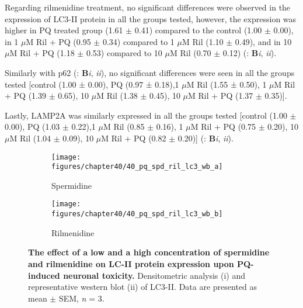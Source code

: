 Regarding rilmenidine treatment, no significant differences were observed in the expression of LC3-II protein in all the groups tested, however, the expression was higher in PQ treated group (1.61 $\pm$ 0.41) compared to the control (1.00 $\pm$ 0.00), in 1 $\mu$M Ril + PQ (0.95 $\pm$ 0.34) compared to 1 $\mu$M Ril (1.10 $\pm$ 0.49), and in 10 $\mu$M Ril + PQ (1.18 $\pm$ 0.53) compared to 10 $\mu$M Ril (0.70 $\pm$ 0.12) (: \textbf{B}\textit{i}, \textit{ii}).

Similarly with p62 (: \textbf{B}\textit{i}, \textit{ii}), no significant differences were seen in all the groups tested [control (1.00 ± 0.00), PQ (0.97 ± 0.18),1 $\mu$M Ril (1.55 ± 0.50), 1 $\mu$M Ril + PQ (1.39 $\pm$ 0.65), 10 $\mu$M Ril (1.38 $\pm$ 0.45), 10 $\mu$M Ril + PQ (1.37 $\pm$ 0.35)].

Lastly, LAMP2A was similarly expressed in all the groups tested [control (1.00 $\pm$ 0.00), PQ (1.03 $\pm$ 0.22),1 $\mu$M Ril (0.85 $\pm$ 0.16), 1 $\mu$M Ril + PQ (0.75 $\pm$ 0.20), 10 $\mu$M Ril (1.04 $\pm$ 0.09), 10 $\mu$M Ril + PQ (0.82 $\pm$ 0.20)] (: \textbf{B}\textit{i}, \textit{ii}).

\begin{figure}[!htbp]
  \center
  \begin{subfigure}[b]{0.495\linewidth}
    \texttt{[image: figures/chapter40/40\_pq\_spd\_ril\_lc3\_wb\_a]}
    \caption{Spermidine}
  \end{subfigure}
  \begin{subfigure}[b]{0.495\linewidth}
    \texttt{[image: figures/chapter40/40\_pq\_spd\_ril\_lc3\_wb\_b]}
    \caption{Rilmenidine}
  \end{subfigure}
  \caption[The effect of a low and a high concentration of spermidine and rilmenidine on LC-II protein expression upon PQ-induced neuronal toxicity]{\textbf{The effect of a low and a high concentration of spermidine and rilmenidine on LC-II protein expression upon PQ-induced neuronal toxicity.} Densitometric analysis (i) and representative western blot  (ii) of LC3-II. Data are presented as mean $\pm$ SEM, \textit{n} = 3.}
  \label{fig:40_pq_spd_ril_lc3_wb_a}
\end{figure}
  
